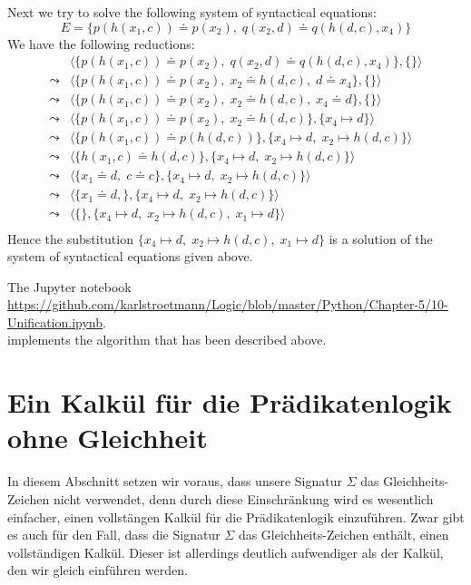 \exampleEng
Next we try to solve the following system of syntactical equations: 
\[ E = \big\{ p(h(x_1,c)) \doteq p(x_2),\; q(x_2, d) \doteq q(h(d,c),x_4) \big\} \]
We have the following reductions:
$$
\begin{array}{ll}
          & \big\langle \big\{ p(h(x_1,c)) \doteq p(x_2),\; q(x_2, d) \doteq q(h(d,c),x_4) \big\}, \{ \} \big\rangle \\[0.2cm]
 \leadsto & \big\langle \big\{ p(h(x_1,c)) \doteq p(x_2),\; x_2 \doteq h(d,c), \; d \doteq x_4 \big\}, \{ \} \big\rangle \\[0.2cm]
 \leadsto & \big\langle \big\{ p(h(x_1,c)) \doteq p(x_2),\; x_2 \doteq h(d,c), \; x_4 \doteq d \big\}, \{ \} \big\rangle \\[0.2cm]
 \leadsto & \big\langle \big\{ p(h(x_1,c)) \doteq p(x_2),\; x_2 \doteq h(d,c) \big\}, \{ x_4 \mapsto d \} \big\rangle \\[0.2cm]
 \leadsto & \big\langle \big\{ p(h(x_1,c)) \doteq p(h(d,c)) \big\}, \{ x_4 \mapsto d,\; x_2 \mapsto h(d,c) \} \big\rangle \\[0.2cm]
 \leadsto & \big\langle \big\{ h(x_1,c) \doteq h(d,c) \big\}, \{ x_4 \mapsto d,\; x_2 \mapsto h(d,c) \} \big\rangle \\[0.2cm]
 \leadsto & \big\langle \big\{ x_1 \doteq d,\; c \doteq c \big\}, \{ x_4 \mapsto d,\; x_2 \mapsto h(d,c) \} \big\rangle \\[0.2cm]
 \leadsto & \big\langle \big\{ x_1 \doteq d,\big\}, \{ x_4 \mapsto d,\; x_2 \mapsto h(d,c) \} \big\rangle \\[0.2cm]
 \leadsto & \big\langle \big\{\big\}, \{ x_4 \mapsto d,\; x_2 \mapsto h(d,c),\; x_1 \mapsto d \} \big\rangle \\[0.2cm]
\end{array}
$$
Hence the  substitution  $\{ x_4 \mapsto d,\; x_2 \mapsto h(d,c),\; x_1 \mapsto d \}$ is a solution
of the system of syntactical equations given above.
\eox


\noindent
The Jupyter notebook
\\[0.2cm]
\hspace*{0.0cm}
\href{https://github.com/karlstroetmann/Logic/blob/master/Python/Chapter-5/10-Unification.ipynb}{https://github.com/karlstroetmann/Logic/blob/master/Python/Chapter-5/10-Unification.ipynb}.
\\[0.2cm]
implements the algorithm that has been described above.

\section{Ein Kalkül für die Prädikatenlogik ohne Gleichheit \label{sec:fol-calculus}}
In diesem Abschnitt setzen wir voraus, dass unsere Signatur $\Sigma$ das Gleichheits-Zeichen nicht
verwendet, denn durch diese Einschränkung wird es wesentlich einfacher, einen vollstängen Kalkül für
die Prädikatenlogik einzuführen.  Zwar gibt es auch für den Fall, dass die Signatur $\Sigma$ das
Gleichheits-Zeichen enthält, einen vollständigen Kalkül.  Dieser ist allerdings deutlich
aufwendiger als der Kalkül, den wir gleich einführen werden.


